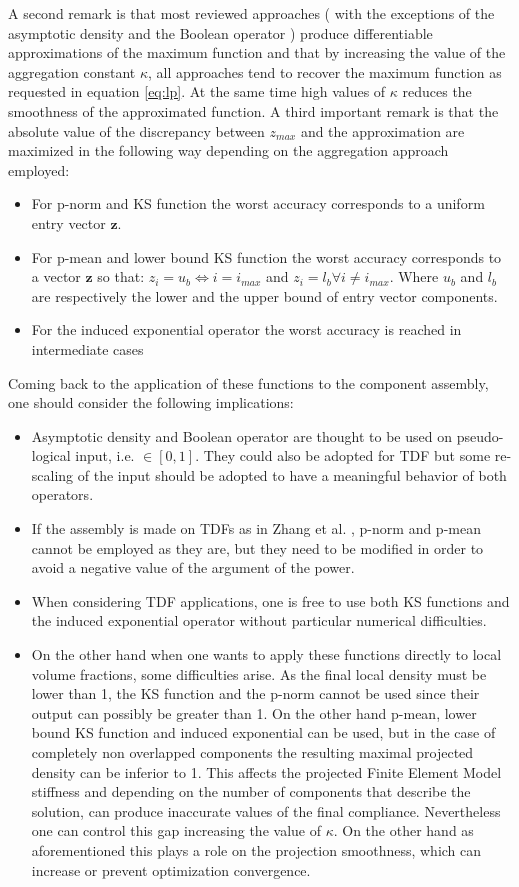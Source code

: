 A second remark is that most reviewed approaches ( with the exceptions of the asymptotic density and the Boolean operator ) produce differentiable approximations of the maximum function and that by increasing the value of the aggregation constant $\kappa$, all approaches tend to recover the maximum function as requested in equation \eqref{eq:lp}. At the same time high values of $\kappa$ reduces the smoothness of the approximated function. A third important remark is that the absolute value of the discrepancy between  $z_{max}$ and the approximation are maximized in the following way depending on the aggregation approach employed:
\begin{itemize}
    \item For p-norm and KS function the worst accuracy corresponds to a uniform entry vector $\mathbf{z}$.
    \item For p-mean and lower bound KS function the worst accuracy corresponds to a vector $\mathbf{z}$ so that: $z_i=u_b \Leftrightarrow i=i_{max}$ and $z_i=l_b \forall i\neq i_{max}$. Where $u_b$ and $l_b$ are respectively the lower and the upper bound of entry vector components.
    \item For the induced exponential operator the worst accuracy is reached in intermediate cases
\end{itemize}
Coming back to the application of these functions to the component assembly, one should consider the following implications:
\begin{itemize}
\item Asymptotic density and Boolean operator are thought to be used on pseudo-logical input, i.e. $\in [0,1]$. They could also be adopted for TDF but some re-scaling of the input should be adopted to have a meaningful behavior of both operators. 
\item If the assembly is made on TDFs as in Zhang et al. \cite{zhang2016new}, p-norm and p-mean cannot be employed as they are, but they need to be modified in order to avoid a negative value of the argument of the power.
\item When considering TDF applications, one is free to use both KS functions and the induced exponential operator without particular numerical difficulties.
\item On the other hand when one wants to apply these functions directly to local volume fractions, some difficulties arise. As the final local density must be lower than 1, the KS function and the p-norm cannot be used since their output can possibly be greater than 1. On the other hand  p-mean, lower bound KS function and induced exponential can be used, but in the case of completely non overlapped components the resulting maximal projected density can be inferior to 1. This affects the projected Finite Element Model stiffness and depending on the number of components that describe the solution, can produce inaccurate values of the final compliance. Nevertheless one can control this gap increasing the value of $\kappa$. On the other hand as aforementioned this plays a role on the projection smoothness, which can increase or prevent optimization convergence.
\end{itemize}
